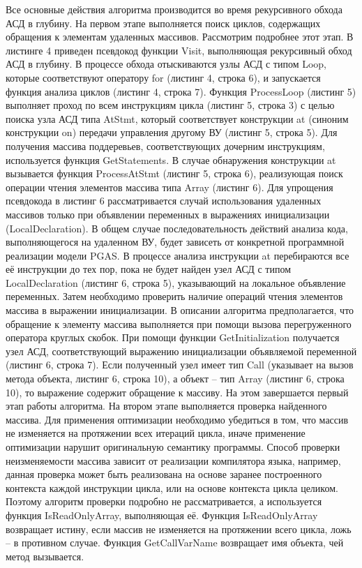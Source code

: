 Все основные действия алгоритма производится во время рекурсивного обхода АСД в глубину. На первом этапе выполняется поиск циклов, содержащих обращения к элементам удаленных массивов. Рассмотрим подробнее этот этап. В листинге 4 приведен псевдокод функции Visit, выполняющая рекурсивный обход АСД в глубину. В процессе обхода отыскиваются узлы АСД с типом Loop, которые соответствуют оператору for (листинг 4, строка 6), и запускается функция анализа циклов (листинг 4, строка 7).
Функция ProcessLoop (листинг 5) выполняет проход по всем инструкциям цикла (листинг 5, строка 3) с целью поиска узла АСД типа AtStmt, который соответствует конструкции at (синоним конструкции on) передачи управления другому ВУ (листинг 5, строка 5). Для получения массива поддеревьев, соответствующих дочерним инструкциям, используется функция GetStatements. В случае обнаружения конструкции at вызывается функция ProcessAtStmt (листинг 5, строка 6), реализующая поиск операции чтения элементов массива типа Array (листинг 6). Для упрощения псевдокода в листинг 6 рассматривается случай использования удаленных массивов только при объявлении переменных в выражениях инициализации (LocalDeclaration). В общем случае последовательность действий анализа кода, выполняющегося на удаленном ВУ, будет зависеть от конкретной программной реализации модели PGAS. В процессе анализа инструкции at перебираются все её инструкции до тех пор, пока не будет найден узел АСД с типом LocalDeclaration (листинг 6, строка 5), указывающий на локальное объявление переменных. Затем необходимо проверить наличие операций чтения элементов массива в выражении инициализации. В описании алгоритма предполагается, что обращение к элементу массива выполняется при помощи вызова перегруженного оператора круглых скобок.  При помощи функции GetInitialization получается узел АСД, соответствующий выражению инициализации объявляемой переменной (листинг 6, строка 7). Если полученный узел имеет тип Call (указывает на вызов метода объекта, листинг 6, строка 10), а объект -- тип Array (листинг 6, строка 10), то выражение содержит обращение к массиву. На этом завершается первый этап работы алгоритма.
 На втором этапе выполняется проверка найденного массива. Для применения оптимизации необходимо убедиться в том, что массив не изменяется на протяжении всех итераций цикла, иначе применение оптимизации нарушит оригинальную семантику программы. Способ проверки неизменяемости массива зависит от реализации компилятора языка, например, данная проверка может быть реализована на основе заранее построенного контекста каждой инструкции цикла, или на основе контекста цикла целиком. Поэтому алгоритм проверки подробно не рассматривается, а используется функция IsReadOnlyArray, выполняющая её. Функция IsReadOnlyArray возвращает истину, если массив не изменяется на протяжении всего цикла, ложь – в противном случае. Функция GetCallVarName возвращает имя объекта, чей метод вызывается.
 
